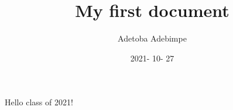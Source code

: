 \documentclass{article}
\title{My first document}
\date{2021- 10- 27}
\author{Adetoba Adebimpe}
\begin{document}
	\maketitle
	\newpage
	Hello class of 2021!
\end{document}
